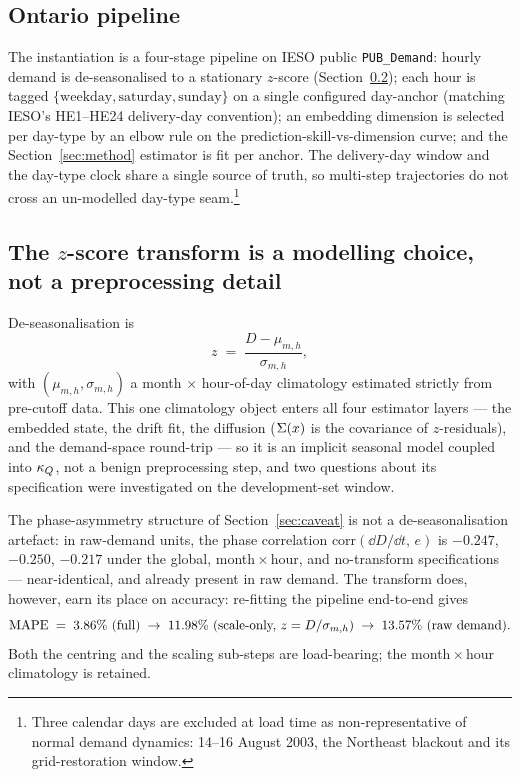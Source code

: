 \subsection{Ontario pipeline}
\label{sec:pipeline}

The instantiation is a four-stage pipeline on IESO public
\texttt{PUB\_Demand}: hourly demand is de-seasonalised to a stationary
\(z\)-score (Section~\ref{sec:zscore}); each hour is tagged
\(\{\mathrm{weekday}, \mathrm{saturday}, \mathrm{sunday}\}\) on a
single configured day-anchor (matching IESO's HE1--HE24 delivery-day
convention); an embedding dimension is selected per day-type by an
elbow rule on the prediction-skill-vs-dimension curve; and the
Section~\ref{sec:method} estimator is fit per anchor. The delivery-day
window and the day-type clock share a single source of truth, so
multi-step trajectories do not cross an un-modelled day-type
seam.\footnote{Three calendar days are excluded at load time as
non-representative of normal demand dynamics: 14--16 August 2003, the
Northeast blackout and its grid-restoration window.}

\subsection{The \(z\)-score transform is a modelling choice, not a
preprocessing detail}
\label{sec:zscore}

De-seasonalisation is
\begin{equation}
\label{eq:zscore}
z \;=\; \frac{D - \mu_{m,h}}{\sigma_{m,h}},
\end{equation}
with \((\mu_{m,h}, \sigma_{m,h})\) a month \(\times\) hour-of-day
climatology estimated strictly from pre-cutoff data. This one
climatology object enters all four estimator layers --- the embedded
state, the drift fit, the diffusion (\(\Sigma(x)\) is the covariance of
\(z\)-residuals), and the demand-space round-trip --- so it is an
implicit seasonal model coupled into \(\kappa_{Q}\), not a benign
preprocessing step, and two questions about its specification were
investigated on the development-set window.

The phase-asymmetry structure of Section~\ref{sec:caveat} is not a
de-seasonalisation artefact: in raw-demand units, the phase
correlation \(\mathrm{corr}(\dd D/\dd t,\, e)\) is \(-0.247\),
\(-0.250\), \(-0.217\) under the global, month\,\(\times\)\,hour, and
no-transform specifications --- near-identical, and already present in
raw demand. The transform does, however, earn its place on accuracy:
re-fitting the pipeline end-to-end gives
\begin{equation}
\label{eq:zscore-mape}
\mathrm{MAPE} \;=\; 3.86\%\ \text{(full)}
\;\to\; 11.98\%\ \text{(scale-only, }z = D/\sigma_{m,h})
\;\to\; 13.57\%\ \text{(raw demand)}.
\end{equation}
Both the centring and the scaling sub-steps are load-bearing; the
month\,\(\times\)\,hour climatology is retained.

